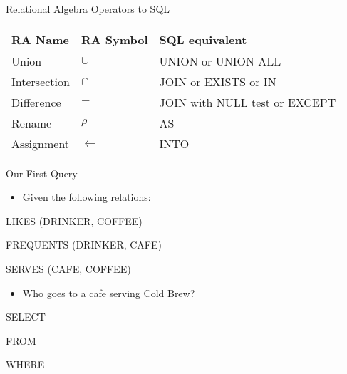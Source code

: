 \documentclass[aspectratio=169]{beamer}
\begin{document}
\begin{frame}{Relational Algebra Operators to SQL}

\begin{tabular}{|l|l|l|} \hline
RA Name & RA Symbol &  SQL equivalent \\ \hline
Union & $\cup$ & UNION or UNION ALL \\\hline
Intersection & $\cap$ & JOIN or EXISTS or IN \\ \hline
Difference & $-$ & JOIN with NULL test or EXCEPT \\ \hline
Rename & $\rho$ & AS \\ \hline
Assignment & $\leftarrow$ & INTO \\ \hline
\end{tabular}

\end{frame}


\begin{frame}[fragile]{Our First Query}
\begin{itemize}
\item Given the following relations:
\end{itemize}


LIKES (DRINKER, COFFEE)

FREQUENTS (DRINKER, CAFE)

SERVES (CAFE, COFFEE)

\begin{itemize}
\item Who goes to a cafe serving Cold Brew?  %
\end{itemize}

\begin{SQL}
SELECT

FROM

WHERE
\end{SQL}
\end{frame}
\end{document}
